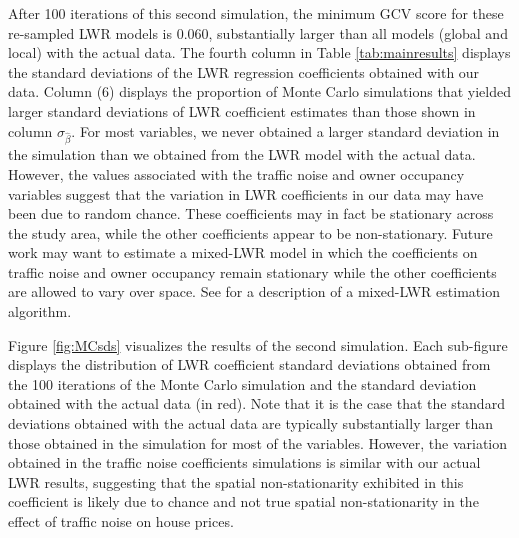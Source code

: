 \documentclass{article}\usepackage{graphicx, color}
\begin{document}
After 100 iterations of this second simulation, the minimum GCV score for these re-sampled LWR models is 0.060, substantially larger than all models (global and local) with the actual data. The fourth column in Table \ref{tab:mainresults} displays the standard deviations of the LWR regression coefficients obtained with our data. Column (6) displays the proportion of Monte Carlo simulations that yielded larger standard deviations of LWR coefficient estimates than those shown in column $\sigma_{\hat{\beta}}$. For most variables, we never obtained a larger standard deviation in the simulation than we obtained from the LWR model with the actual data. However, the values associated with the traffic noise and owner occupancy variables suggest that the variation in LWR coefficients in our data may have been due to random chance. These coefficients may in fact be stationary across the study area, while the other coefficients appear to be non-stationary. Future work may want to estimate a mixed-LWR model in which the coefficients on traffic noise and owner occupancy remain stationary while the other coefficients are allowed to vary over space. See \citet{Fotheringham2002} for a description of a mixed-LWR estimation algorithm. 

Figure \ref{fig:MCsds} visualizes the results of the second simulation. Each sub-figure displays the distribution of LWR coefficient standard deviations obtained from the 100 iterations of the Monte Carlo simulation and the standard deviation obtained with the actual data (in red). Note that it is the case that the standard deviations obtained with the actual data are typically substantially larger than those obtained in the simulation for most of the variables. However, the variation obtained in the traffic noise coefficients simulations is similar with our actual LWR results, suggesting that the spatial non-stationarity exhibited in this coefficient is likely due to chance and not true spatial non-stationarity in the effect of traffic noise on house prices. 
\end{document}
